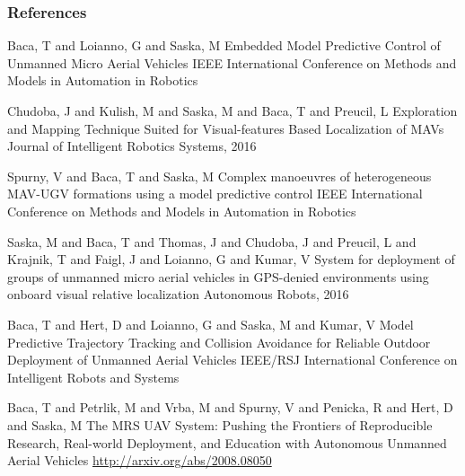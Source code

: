 \documentclass[aspectratio=1610]{beamer}
\begin{document}

  \begin{frame}
    \frametitle{References}
    \tiny{
      \begin{thebibliography}{99}

         Baca, T and Loianno, G and Saska, M
          \newblock Embedded Model Predictive Control of Unmanned Micro Aerial Vehicles
           IEEE International Conference on Methods and Models in Automation in Robotics

         Chudoba, J and Kulish, M and Saska, M and Baca, T and Preucil, L
          \newblock Exploration and Mapping Technique Suited for Visual-features Based Localization of MAVs
          \newblock Journal of Intelligent Robotics Systems, 2016


         Spurny, V and Baca, T and Saska, M
          \newblock Complex manoeuvres of heterogeneous MAV-UGV formations using a model predictive control
           IEEE International Conference on Methods and Models in Automation in Robotics

         Saska, M and Baca, T and Thomas, J and Chudoba, J and Preucil, L and Krajnik, T and Faigl, J and Loianno, G and Kumar, V
          \newblock System for deployment of groups of unmanned micro aerial vehicles in GPS-denied environments using onboard visual relative localization
          \newblock Autonomous Robots, 2016

         Baca, T and Hert, D and Loianno, G and Saska, M and Kumar, V
          \newblock Model Predictive Trajectory Tracking and Collision Avoidance for Reliable Outdoor Deployment of Unmanned Aerial Vehicles
           IEEE/RSJ International Conference on Intelligent Robots and Systems

         Baca, T and Petrlik, M and Vrba, M and Spurny, V and Penicka, R and Hert, D and Saska, M
          \newblock The MRS UAV System: Pushing the Frontiers of Reproducible Research, Real-world Deployment, and Education with Autonomous Unmanned Aerial Vehicles
          \newblock \url{http://arxiv.org/abs/2008.08050}


      \end{thebibliography}
    }
  \end{frame}

\end{document}
